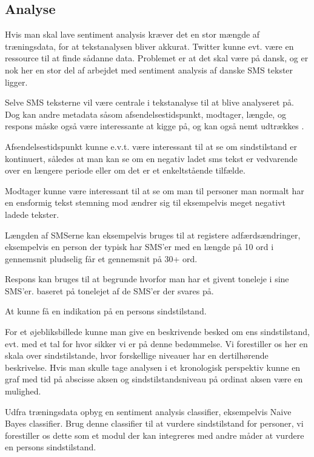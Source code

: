 \subsection{Analyse}
	\begin{description}[style=nextline]
		\item[Har vi data nok?]
		Hvis man skal lave sentiment analysis kræver det en stor mængde af træningsdata, for at tekstanalysen bliver akkurat. Twitter kunne evt. være en ressource til at finde sådanne data. Problemet er at det skal være på dansk, og er nok her en stor del af arbejdet med sentiment analysis af danske SMS tekster ligger.
		\item[Hvilke data skal benyttes?]
		Selve SMS teksterne vil være centrale i tekstanalyse til at blive analyseret på.
		Dog kan andre metadata såsom afsendelsestidspunkt, modtager, længde, og respons måske også være interessante at kigge på, og kan også nemt udtrækkes \citep{misc:androidsmsread}.
		
		Afsendelsestidspunkt kunne e.v.t. være interessant til at se om sindstilstand er kontinuert, således at man kan se om en negativ ladet sms tekst er vedvarende over en længere periode eller om det er et enkeltstående tilfælde.
		
		Modtager kunne være interessant til at se om man til personer man normalt har en ensformig tekst stemning mod ændrer sig til eksempelvis meget negativt ladede tekster.
		
		Længden af SMSerne kan eksempelvis bruges til at registere adfærdsændringer, eksempelvis en person der typisk har SMS'er med en længde på 10 ord i gennemsnit pludselig får et gennemsnit på 30+ ord.
		
		Respons kan bruges til at begrunde hvorfor man har et givent toneleje i sine SMS'er. baseret på tonelejet af de SMS'er der svares på.
		\item[Formål med analysen]
		At kunne få en indikation på en persons sindstilstand.
		\item[Idé til visualisering]
		For et øjebliksbillede kunne man give en beskrivende besked om ens sindstilstand, evt. med et tal for hvor sikker vi er på denne bedømmelse.
		Vi forestiller os her en skala over sindstilstande, hvor forskellige niveauer har en dertilhørende beskrivelse.
		Hvis man skulle tage analysen i et kronologisk perspektiv kunne en graf med tid på abscisse aksen og sindstilstandsniveau på ordinat aksen være en mulighed.
		\item[Oprids a fremgangsmåde]
		Udfra træningsdata opbyg en sentiment analysis classifier, eksempelvis Naive Bayes classifier.
		Brug denne classifier til at vurdere sindstilstand for personer, vi forestiller os dette som et modul der kan integreres med andre måder at vurdere en persons sindstilstand.
	\end{description}
	
